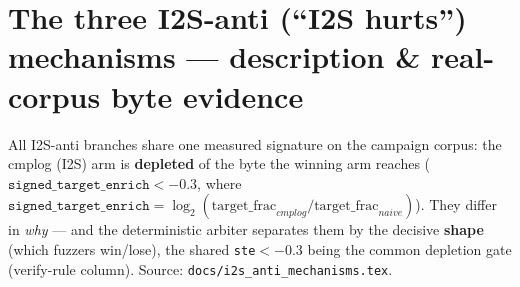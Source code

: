 \documentclass[9pt]{extarticle}
\begin{document}
\section*{\normalsize The three I2S-anti (``I2S hurts'') mechanisms --- description \& real-corpus byte evidence}
\noindent All I2S-anti branches share one measured signature on the campaign corpus: the cmplog (I2S) arm is \textbf{depleted} of the byte the winning arm reaches ($\texttt{signed\_target\_enrich}<-0.3$, where $\texttt{signed\_target\_enrich}=\log_2(\mathrm{target\_frac}_{cmplog}/\mathrm{target\_frac}_{naive})$). They differ in \emph{why} --- and the deterministic arbiter separates them by the decisive \textbf{shape} (which fuzzers win/lose), the shared \texttt{ste}$<-0.3$ being the common depletion gate (verify-rule column). Source: \texttt{docs/i2s\_anti\_mechanisms.tex}.\par\medskip
\small\setlength{\tabcolsep}{5pt}\renewcommand{\arraystretch}{1.3}
\end{document}
